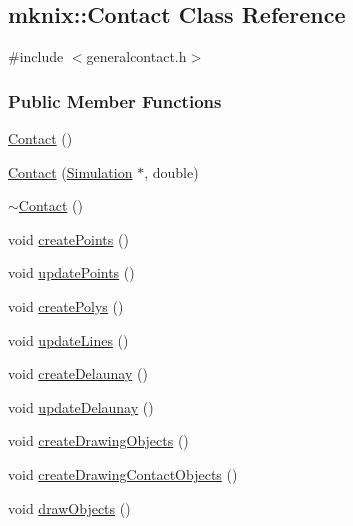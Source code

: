 \hypertarget{classmknix_1_1_contact}{\subsection{mknix\-:\-:Contact Class Reference}
\label{classmknix_1_1_contact}
}


{\ttfamily \#include $<$generalcontact.\-h$>$}

\subsubsection*{Public Member Functions}
\begin{DoxyCompactItemize}
\item 
\hyperlink{classmknix_1_1_contact_acddf7d86870e1d015ca17a1f94533127}{Contact} ()
\item 
\hyperlink{classmknix_1_1_contact_a4bab5ac8e3e65ba5c7dda16de9451fd8}{Contact} (\hyperlink{classmknix_1_1_simulation}{Simulation} $\ast$, double)
\item 
\hyperlink{classmknix_1_1_contact_a409ca0c936dcc34ce4ca1b25780b7635}{$\sim$\-Contact} ()
\item 
void \hyperlink{classmknix_1_1_contact_aff0010eaf0d50819b7cc502449443b71}{create\-Points} ()
\item 
void \hyperlink{classmknix_1_1_contact_a0a9eb3950c6d13b5241cb8a58d9ad11e}{update\-Points} ()
\item 
void \hyperlink{classmknix_1_1_contact_a5334a5c12debb8d064345929201673f6}{create\-Polys} ()
\item 
void \hyperlink{classmknix_1_1_contact_a1f363d51121555347584e34cd880ef12}{update\-Lines} ()
\item 
void \hyperlink{classmknix_1_1_contact_aac0574d8683e781d6f811c782f9604c8}{create\-Delaunay} ()
\item 
void \hyperlink{classmknix_1_1_contact_acd4f6166d705a7641a84aae19fb0ffb3}{update\-Delaunay} ()
\item 
void \hyperlink{classmknix_1_1_contact_a3489052672cf092120e096649448eebb}{create\-Drawing\-Objects} ()
\item 
void \hyperlink{classmknix_1_1_contact_a17e1256371ff92d395ef71e23396b509}{create\-Drawing\-Contact\-Objects} ()
\item 
void \hyperlink{classmknix_1_1_contact_a86ab86ad903f956284324fc2fb69e195}{draw\-Objects} ()
\end{DoxyCompactItemize}



